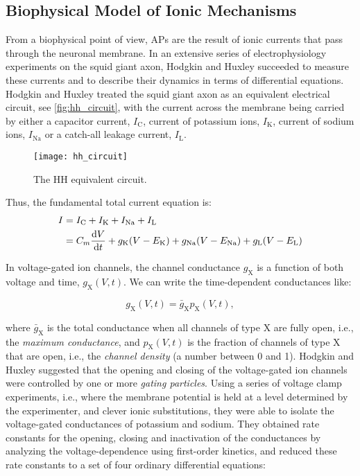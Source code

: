 \subsection{Biophysical Model of Ionic Mechanisms}

From a biophysical point of view, APs are the result of ionic currents that pass through the neuronal membrane. In an extensive series of electrophysiology experiments on the squid giant axon, Hodgkin and Huxley succeeded to measure these currents and to describe their dynamics in terms of differential equations. Hodgkin and Huxley treated the squid giant axon as an equivalent electrical circuit, see \autoref{fig:hh_circuit}, with the current across the membrane being carried by either a capacitor current, $I_\mathrm{C}$, current of potassium ions, $I_\mathrm{K}$, current of sodium ions, $I_\mathrm{Na}$ or a catch-all leakage current, $I_\mathrm{L}$. 
\begin{figure}[!htb]
    \centering
    \texttt{[image: hh\_circuit]}
    \caption{The HH equivalent circuit. 
    }
    \label{fig:hh_circuit}
\end{figure}

Thus, the fundamental total current equation is:
\begin{equation}\label{eq:hh_total_current}
    \begin{aligned}
    I &= I_\mathrm{C} + I_\mathrm{K} + I_\mathrm{Na} + I_\mathrm{L} 
    \\
    &= C_m \frac{\dd{V}}{\dd{t}} + g_\mathrm{K} \qty(V - E_\mathrm{K}) + g_\mathrm{Na} \qty(V - E_\mathrm{Na}) + g_\mathrm{L} \qty(V - E_\mathrm{L})
    \end{aligned}
\end{equation}

In voltage-gated ion channels, the channel conductance $g_\mathrm{X}$ is a function of both voltage and time, $g_\mathrm{X} (V, t)$. We can write the time-dependent conductances like: 

\begin{equation*}
    g_\mathrm{X} (V, t) = \bar{g}_\mathrm{X} p_\mathrm{X} (V, t),
\end{equation*}

where $\bar{g}_\mathrm{X}$ is the total conductance when all channels of type $\mathrm{X}$ are fully open, i.e., the \textit{maximum conductance}, and $p_\mathrm{X} (V, t)$ is the fraction of channels of type $\mathrm{X}$ that are open, i.e., the \textit{channel density} (a number between 0 and 1). Hodgkin and Huxley suggested that the opening and closing of the voltage-gated ion channels were controlled by one or more \textit{gating particles}. Using a series of voltage clamp experiments, i.e., where the membrane potential is held at a level determined by the experimenter, and clever ionic substitutions, they were able to isolate the voltage-gated conductances of potassium and sodium. They obtained rate constants for the opening, closing and inactivation of the conductances by analyzing the voltage-dependence using first-order kinetics, and reduced these rate constants to a set of four ordinary differential equations:

